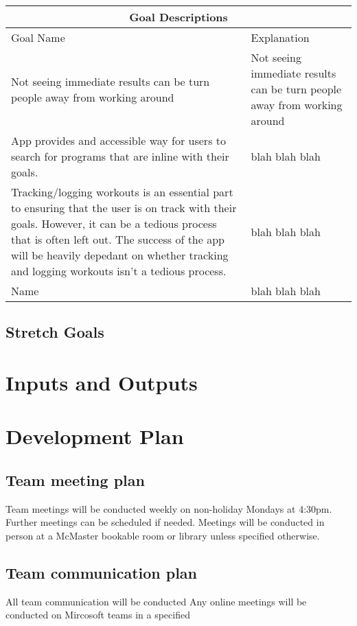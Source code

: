 \documentclass{article}
\begin{document}
	\begin{tabular}{ |p{5cm}|p{8cm}| }
	\hline
	\multicolumn{2}{|c|}{Goal Descriptions} \\
	\hline
	Goal Name & Explanation \\
	\hline
	Not seeing immediate results can be turn people away from working around & Not seeing immediate results can be turn people away from working around \\
	\hline
	App provides and accessible way for users to search for programs that are inline with their goals. & blah blah blah \\
	\hline
	Tracking/logging workouts is an essential part to ensuring that the user is on track with their goals. However, it can be a tedious process that is often left out. The success of the app will be heavily depedant on whether tracking and logging workouts isn’t a tedious process. & blah blah blah \\
	\hline
	Name & blah blah blah \\
	\hline
\end{tabular}

\subsection{Stretch Goals}

\section{Inputs and Outputs}

\section {Development Plan}

\subsection{Team meeting plan}
Team meetings will be conducted weekly on non-holiday Mondays at 4:30pm.
Further meetings can be scheduled if needed.
Meetings will be conducted in person at a McMaster bookable room or library unless specified otherwise.

\subsection{Team communication plan}
All team communication will be conducted 
Any online meetings will be conducted on Mircosoft teams in a specified 
\end{document}
